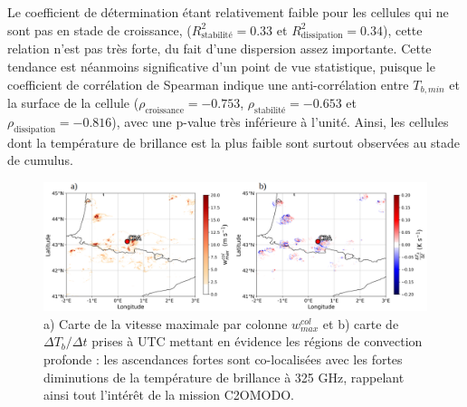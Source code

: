 \documentclass[12pt]{article}
\begin{document}
\begin{multicols}{2}
Le coefficient de détermination étant relativement faible pour les cellules qui ne sont pas en stade de croissance, ($R^2_{\text{stabilité}} = 0.33$ et $R^2_{\text{dissipation}} = 0.34$), cette relation n'est pas très forte, du fait d'une dispersion assez importante. Cette tendance est néanmoins significative d'un point de vue statistique, puisque le coefficient de corrélation de Spearman indique une anti-corrélation entre $T_{b, min}$ et la surface de la cellule ($\rho_{\text{croissance}} = -0.753$, $\rho_{\text{stabilité}} = -0.653$ et $\rho_{\text{dissipation}} = -0.816$), avec une p-value très inférieure à l'unité. Ainsi, les cellules dont la température de brillance est la plus faible sont surtout observées au stade de cumulus.

\end{multicols}

\begin{figure}[H]
    \centering
    \includegraphics[width=0.9\linewidth]{Figures/deltatb.png}
    \caption{a) Carte de la vitesse maximale par colonne $w_{max}^{col}$ et b) carte de $\Delta T_b / \Delta t$ prises à \protect{} UTC mettant en évidence les régions de convection profonde : les ascendances fortes sont co-localisées avec les fortes diminutions de la température de brillance à 325 GHz, rappelant ainsi tout l'intérêt de la mission C2OMODO.} 
    \label{fig:delta_tb}
\end{figure}
\end{document}

